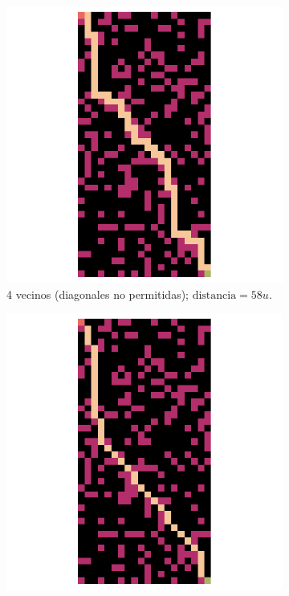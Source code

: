 \begin{enumerate}
\begin{solution}
        \begin{figure}[ht!]
            \centering
            \begin{subfigure}{0.4\textwidth}
                \centering
                \includegraphics[scale=0.3]{../figures/path_03.png}
                \caption{4 vecinos (diagonales no permitidas); $\text{distancia} = 58 u$.}
            \end{subfigure}
            \hspace{1cm}
            \begin{subfigure}{0.4\textwidth}
                \centering
                \includegraphics[scale=0.3]{../figures/path_03_diag.png}

\end{subfigure}
\end{figure}
\end{solution}
\end{enumerate}
